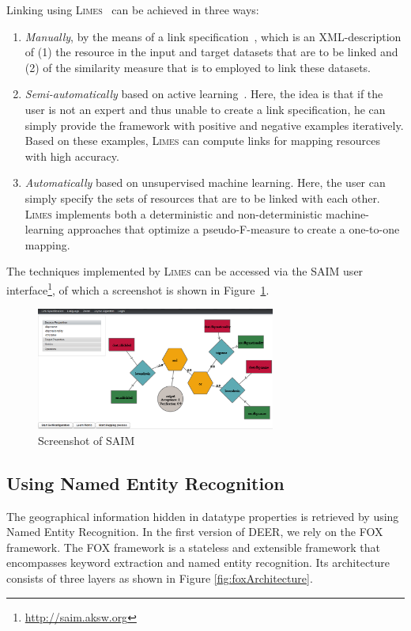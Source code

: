 \documentclass[a4paper,twoside,bibtotoc,abstracton,12pt,BCOR=15mm]{article}
\newcommand{\geolift}{\textsc{DEER}\xspace}
\newcommand{\limes}{\textsc{Limes}\xspace}
\begin{document}
Linking using \limes~\cite{NGON12c,NGON12} can be achieved in three ways:
\begin{enumerate}
\item \emph{Manually}, by the means of a link specification~\cite{NGON12c}, which is an XML-description of (1) the resource in the input and target datasets that are to be linked and (2) of the similarity measure that is to employed to link these datasets.
\item \emph{Semi-automatically} based on active learning~\cite{NGO+11a,NGLY12,NGO+13b}. Here, the idea is that if the user is not an expert and thus unable to create a link specification, he can simply provide the framework with positive and negative examples iteratively. 
Based on these examples, \limes can compute links for mapping resources with high accuracy.
\item \emph{Automatically} based on unsupervised machine learning. Here, the user can simply specify the sets of resources that are to be linked with each other. 
\limes implements both a deterministic and non-deterministic machine-learning approaches that optimize a pseudo-F-measure to create a one-to-one mapping.
\end{enumerate}

The techniques implemented by \limes can be accessed via the SAIM user interface\footnote{\url{http://saim.aksw.org}}, of which a screenshot is shown in Figure~\ref{fig:saim_screenshot}.
\begin{figure}[htb]
\centering
\includegraphics[width=0.7\textwidth]{images/saim_screenshot}
\caption{Screenshot of SAIM}
\label{fig:saim_screenshot}
\end{figure}

\subsection{Using Named Entity Recognition}
The geographical information hidden in datatype properties is retrieved by using Named Entity Recognition.
In the first version of \geolift, we rely on the FOX framework.
The FOX framework is a stateless and extensible framework that encompasses keyword extraction and named entity recognition. 
Its architecture consists of three layers as shown in Figure \ref{fig:foxArchitecture}.
\end{document}
